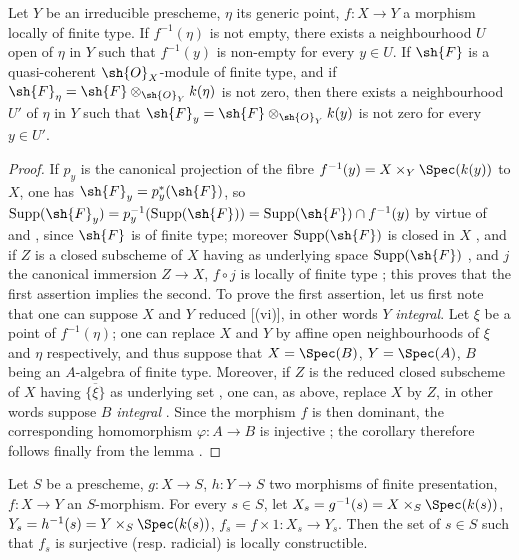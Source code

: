 \begin{corollary}[1.8.6]
\label{IV.1.8.6}
Let $Y$ be an irreducible prescheme, $\eta$ its generic point, $f:X\to Y$ a morphism locally of finite type.
If $f^{-1}(\eta)$ is not empty, there exists a neighbourhood $U$ open of $\eta$ in $Y$ such that $f^{-1}(y)$ is non-empty for every $y\in U$.
If $\sh{F}$ is a quasi-coherent $\sh{O}_X$-module of finite type, and if $\sh{F}_\eta=\sh{F}\otimes_{\sh{O}_Y} k(\eta)$ is not zero, then there exists a neighbourhood $U'$ of $\eta$ in $Y$ such that $\sh{F}_y=\sh{F}\otimes_{\sh{O}_Y} k(y)$ is not zero for every $y\in U'$.
\end{corollary}

\begin{proof}
If $p_y$ is the canonical projection of the fibre $f^{-1}(y)=X\times_Y\Spec(k(y))$ to $X$, one has $\sh{F}_y=p_y^*(\sh{F})$, so $\mathrm{Supp}(\sh{F}_y)=p_y^{-1}(\mathrm{Supp}(\sh{F}))=\mathrm{Supp}(\sh{F})\cap f^{-1}(y)$ by virtue of  and , since $\sh{F}$ is of finite type; moreover $\mathrm{Supp}(\sh{F})$ is closed in $X$ , and if $Z$ is a closed subscheme of $X$ having as underlying space $\mathrm{Supp}(\sh{F})$ , and $j$ the canonical immersion $Z\to X$, $f\circ j$ is locally of finite type ; this proves that the first assertion implies the second.
To prove the first assertion, let us first note that one can suppose $X$ and $Y$ reduced [(vi)], in other words $Y$ \emph{integral}.
Let $\xi$ be a point of $f^{-1}(\eta)$; one can replace $X$ and $Y$ by affine open neighbourhoods of $\xi$ and $\eta$ respectively, and thus suppose that $X=\Spec(B)$, $Y=\Spec(A)$, $B$ being an $A$-algebra of finite type.
Moreover, if $Z$ is the reduced closed subscheme of $X$ having $\overline{\{\xi\}}$ as underlying set , one can, as above, replace $X$ by $Z$, in other words suppose $B$ \emph{integral} .
Since the morphism $f$ is then dominant, the corresponding homomorphism $\varphi:A\to B$ is injective ; the corollary therefore follows finally from the lemma .
\end{proof}


\begin{proposition}[1.8.7]
\label{IV.1.8.7}
Let $S$ be a prescheme, $g:X\to S$, $h:Y\to S$ two morphisms of finite presentation, $f:X\to Y$ an $S$-morphism.
For every $s\in S$, let $X_s=g^{-1}(s)=X\times_S\Spec(k(s))$, $Y_s=h^{-1}(s)=Y\times_S\Spec(k(s))$, $f_s=f\times 1:X_s\to Y_s$.
Then the set of $s\in S$ such that $f_s$ is surjective (resp. radicial) is locally constructible.
\end{proposition}

